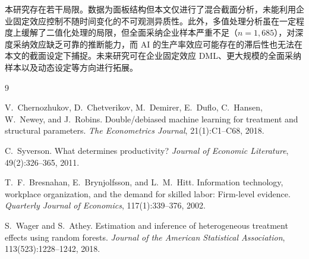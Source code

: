 \documentclass[UTF8,11pt,a4paper]{ctexart}
\begin{document}
本研究存在若干局限。数据为面板结构但本文仅进行了混合截面分析，未能利用企业固定效应控制不随时间变化的不可观测异质性。此外，多值处理分析虽在一定程度上缓解了二值化处理的局限，但全面采纳企业样本严重不足（$n = 1{,}685$），对深度采纳效应缺乏可靠的推断能力，而 AI 的生产率效应可能存在的滞后性也无法在本文的截面设定下捕捉。未来研究可在企业固定效应 DML、更大规模的全面采纳样本以及动态设定等方向进行拓展。

\begin{thebibliography}{9}
\small

V.~Chernozhukov, D.~Chetverikov, M.~Demirer, E.~Duflo, C.~Hansen, W.~Newey, and J.~Robins.
\newblock Double/debiased machine learning for treatment and structural parameters.
\newblock \textit{The Econometrics Journal}, 21(1):C1--C68, 2018.

C.~Syverson.
\newblock What determines productivity?
\newblock \textit{Journal of Economic Literature}, 49(2):326--365, 2011.

T.~F.~Bresnahan, E.~Brynjolfsson, and L.~M.~Hitt.
\newblock Information technology, workplace organization, and the demand for skilled labor: Firm-level evidence.
\newblock \textit{Quarterly Journal of Economics}, 117(1):339--376, 2002.

S.~Wager and S.~Athey.
\newblock Estimation and inference of heterogeneous treatment effects using random forests.
\newblock \textit{Journal of the American Statistical Association}, 113(523):1228--1242, 2018.

\end{thebibliography}

\clearpage
\appendix

\end{document}
